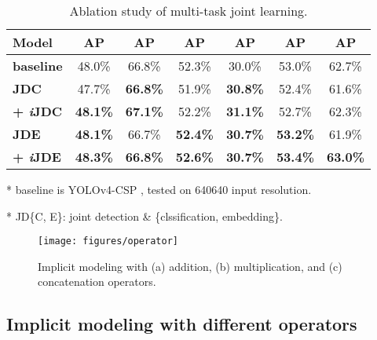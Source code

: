 \documentclass[10pt,twocolumn,letterpaper]{article}
\begin{document}
\begin{table}[h]
	\centering
	\begin{threeparttable}[h]
		\footnotesize
		\caption{Ablation study of multi-task joint learning.}
		\label{table:e3}
		\setlength\tabcolsep{4.5pt}
		\begin{tabular}{lcccccc}
			\toprule
			\textbf{Model} & \textbf{AP} & \textbf{AP} & \textbf{AP} & \textbf{AP} & \textbf{AP} & \textbf{AP} \\				
			\midrule
			\textbf{baseline} & 48.0\% & 66.8\% & 52.3\% & 30.0\% & 53.0\% & 62.7\% \\				
			\midrule
			\textbf{JDC} & 47.7\% & \textbf{66.8\%} & 51.9\% & \textbf{30.8\%} & 52.4\% & 61.6\% \\
			\textbf{+ \textit{i}JDC} & \textbf{48.1\%} & \textbf{67.1\%} & 52.2\% & \textbf{31.1\%} & 52.7\% & 62.3\% \\				
			\midrule
			\textbf{JDE} & \textbf{48.1\%} & 66.7\% & \textbf{52.4\%} & \textbf{30.7\%} & \textbf{53.2\%} & 61.9\% \\
			\textbf{+ \textit{i}JDE} & \textbf{48.3\%} & \textbf{66.8\%} & \textbf{52.6\%} & \textbf{30.7\%} & \textbf{53.4\%} & \textbf{63.0\%} \\				
			\bottomrule
		\end{tabular}
		\begin{tablenotes}[flushleft]
		\footnotesize
		\item[*] baseline is YOLOv4-CSP \cite{wang2020scaled}, tested on 640640 input resolution.
		\item[*] JD\{C, E\}: joint detection \& \{clssification, embedding\}.
	\end{tablenotes}
	\end{threeparttable}
\end{table}

\begin{figure}[h]
\begin{center}
	\texttt{[image: figures/operator]}
\end{center}
\caption{Implicit modeling with (a) addition, (b) multiplication, and (c) concatenation operators.}
\label{fig:opr}
\end{figure}

\newpage

\subsection{Implicit modeling with different operators}
\label{sec:imo}
\end{document}
